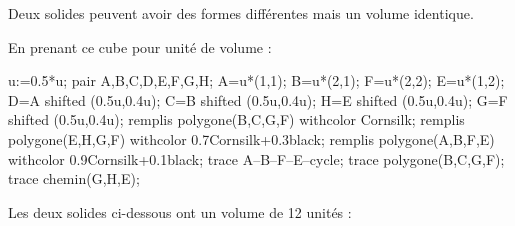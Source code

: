 \begin{remarque}
    Deux solides peuvent avoir des formes différentes mais un volume identique.

    En prenant ce cube pour unité de volume :
    \begin{Geometrie}
        u:=0.5*u;
        pair A,B,C,D,E,F,G,H;
        A=u*(1,1);
        B=u*(2,1);
        F=u*(2,2);
        E=u*(1,2);
        D=A shifted (0.5u,0.4u);
        C=B shifted (0.5u,0.4u);
        H=E shifted (0.5u,0.4u);
        G=F shifted (0.5u,0.4u);
        remplis polygone(B,C,G,F) withcolor Cornsilk;
        remplis polygone(E,H,G,F) withcolor 0.7Cornsilk+0.3black;
        remplis polygone(A,B,F,E) withcolor 0.9Cornsilk+0.1black;
        trace A--B--F--E--cycle;
        trace polygone(B,C,G,F);
        trace chemin(G,H,E);
    \end{Geometrie}
    
    Les deux solides ci-dessous ont un volume de 12 unités :


\end{remarque}
